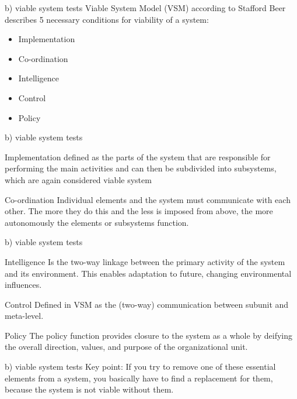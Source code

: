 \documentclass{beamer}
\begin{document}
	\begin{frame}{b) viable system tests}
    	Viable System Model (VSM) according to Stafford Beer describes 5 necessary conditions for viability of a system:
		\begin{itemize}
			\item Implementation
			\item Co-ordination
			\item Intelligence
			\item Control
			\item Policy
		\end{itemize}
	\end{frame}
	
	\begin{frame}{b) viable system tests}
		\begin{block}{Implementation}
			defined as the parts of the system that are responsible for performing the main activities and can then be subdivided into subsystems, which are again considered viable system 
		\end{block}
		\begin{block}{Co-ordination}
			Individual elements and the system must communicate with each other. The more they do this and the less is imposed from above, the more autonomously the elements or subsystems function.
		\end{block}
	\end{frame}
	
	\begin{frame}{b) viable system tests}
		\begin{block}{Intelligence}
			Is the two-way linkage between the primary activity of the system and its environment. This enables adaptation to future, changing environmental influences.
		\end{block}
		\begin{block}{Control}
			Defined in VSM as the (two-way) communication between subunit and meta-level.
		\end{block}
		\begin{block}{Policy}
			The policy function provides closure to the system as a whole by deifying the overall direction, values, and purpose of the organizational unit.
		\end{block}
	\end{frame}
	
	
	\begin{frame}{b) viable system tests}
		Key point: If you try to remove one of these essential elements from a system, you basically have to find a replacement for them, because the system is not viable without them.
	\end{frame}
	
\end{document}
